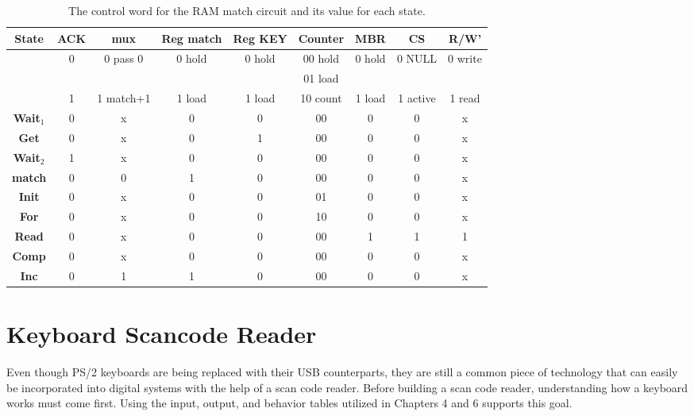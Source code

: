 \begin{table}
{\tiny
\begin{tabular}{c||c|c|c|c|c|c|c|c}  
{\bf State }  & ACK   & mux       &  Reg match& Reg KEY & Counter     & MBR    & CS       & R/W'    \\ \hline
        & 0     & 0 pass 0  &  0 hold   & 0 hold  & 00 hold     & 0 hold & 0 NULL   & 0 write \\ \hline
        &       &           &           &         & 01 load     &        &          &         \\ \hline
        & 1     & 1 match+1 &  1 load   & 1 load  & 10 count    & 1 load & 1 active & 1 read  \\ \hline \hline
{\bf Wait$_1$ }  & 0     & x         & 0         & 0       & 00          & 0      & 0        & x       \\ \hline
{\bf Get   }  & 0     & x         & 0         & 1       & 00          & 0      & 0        & x       \\ \hline
{\bf Wait$_2$ }  & 1     & x         & 0         & 0       & 00          & 0      & 0        & x       \\ \hline
{\bf match }   & 0     & 0         & 1         & 0       & 00          & 0      & 0        & x       \\ \hline
{\bf Init }   & 0     & x         & 0         & 0       & 01          & 0      & 0        & x       \\ \hline
{\bf For  }   & 0     & x         & 0         & 0       & 10          & 0      & 0        & x       \\ \hline
{\bf Read }   & 0     & x         & 0         & 0       & 00          & 1      & 1        & 1       \\ \hline
{\bf Comp }   & 0     & x         & 0         & 0       & 00          & 0      & 0        & x       \\ \hline
{\bf Inc }    & 0     & 1         & 1         & 0       & 00          & 0      & 0        & x       \\ 
\end{tabular}
}
\caption{The control word for the RAM match circuit and its value for each state.}
\label{table:RAMmatch}
\end{table}



\section{Keyboard Scancode Reader}
Even though PS/2 keyboards are being replaced with their USB counterparts,
they are still a common piece of technology that can easily be incorporated 
into digital systems with the help of a scan code reader.  Before building
a scan code reader, understanding how a keyboard works must come first.
Using the input, output, and behavior tables utilized
in Chapters 4 and 6 supports this goal.

